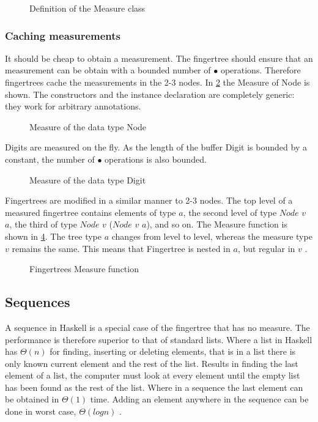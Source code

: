 \begin{figure}[h!]

\caption{Definition of the Measure class \label{fig:measure}}
\end{figure}

\subsubsection{Caching measurements}
It should be cheap to obtain a measurement. The fingertree should ensure that an
measurement can be obtain with a bounded number of $\bullet$ operations.
Therefore fingertrees cache the measurements in the 2-3 nodes. In
\cref{fig:measureNode} the Measure of Node is shown.
The constructors and the instance declaration are completely generic: they
work for arbitrary annotations.

\begin{figure}[h!]

\caption{Measure of the data type Node \label{fig:measureNode}}
\end{figure}

Digits are measured on the fly. As the length of the buffer Digit is bounded by
a constant, the number of $\bullet$ operations is also bounded.

\begin{figure}[h!]

\caption{Measure of the data type Digit \label{fig:measureDigit}}
\end{figure}

Fingertrees are modified in a similar manner to 2-3 nodes.
The top level of a measured fingertree contains elements of type $a$, the second
level of type $Node$ $v$ $a$, the third of type $Node$ $v$ ($Node$ $v$ $a$), and
so on. The Measure function is shown in \cref{fig:measureFingerTree}. The tree 
type $a$ changes from level to level, whereas the measure type $v$ remains the 
same. This means that Fingertree is nested in $a$, but regular in $v$ \cite{fingertree}.

\begin{figure}[h!]

\caption{Fingertrees Measure function \label{fig:measureFingerTree}}
\end{figure}


\subsection{Sequences}
A sequence in Haskell is a special case of the fingertree that has no measure.
The performance is therefore superior to that of standard lists. Where a list in
Haskell has $\Theta(n)$ for finding, inserting or deleting elements, that is in
a list there is only known current element and the rest of the list. Results in 
finding the last element of a list, the computer must look at every element
until the empty list has been found as the rest of the list. Where in a sequence
the last element can be obtained in $\Theta(1)$ time. Adding an element anywhere
in the sequence can be done in worst case, $\Theta(log n)$ \cite{fingertree}.

